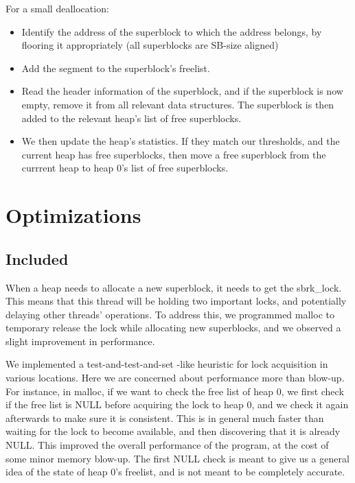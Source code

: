 \documentclass[a4paper, 12pt]{article}
\begin{document}
For a small deallocation:

\begin{itemize}
	\item Identify the address of the superblock to which the address belongs, by flooring it appropriately (all superblocks are SB-size aligned)
	\item Add the segment to the superblock's freelist.
	\item Read the header information of the superblock, and if the superblock is now empty, remove it from all relevant data structures. The superblock is then added to the relevant heap's list of free superblocks.
	\item We then update the heap's statistics. If they match our thresholds, and the current heap has free superblocks, then move a free superblock from the currrent heap to heap 0's list of free superblocks.
\end{itemize}

\section{Optimizations}

\subsection{Included}


When a heap needs to allocate a new superblock, it needs to get the sbrk\_lock. This means that this thread will be holding two important locks, and potentially delaying other threads' operations. To address this, we programmed malloc to temporary release the lock while allocating new superblocks, and we observed a slight improvement in performance.

We implemented a test-and-test-and-set -like heuristic for lock acquisition in various locations. Here we are concerned about performance more than blow-up. For instance, in malloc, if we want to check the free list of heap 0, we first check if the free list is NULL before acquiring the lock to heap 0, and we check it again afterwards to make sure it is consistent. This is in general much faster than waiting for the lock to become available, and then discovering that it is already NULL. This improved the overall performance of the program, at the cost of some minor memory blow-up. The first NULL check is meant to give us a general idea of the state of heap 0's freelist, and is not meant to be completely accurate.
\end{document}
